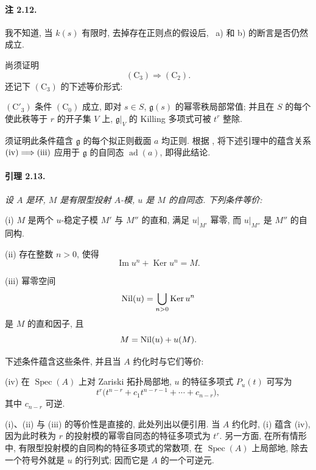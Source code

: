 \paragraph{\textbf{注 2.12.}}
我不知道, 当 \(k(s)\) 有限时, 去掉存在正则点的假设后, ~a) 和 b) 的断言是否仍然成立.

尚须证明
\[
  (\mathrm C_3)\Longrightarrow(\mathrm C_2).
\]
还记下 \((\mathrm C_3)\) 的下述等价形式:

\smallskip
\noindent
\textup{\((\mathrm C'_3)\)}
条件 \((\mathrm C_0)\) 成立, 即对 \(s\in S\), \(\mathfrak g(s)\) 的幂零秩局部常值; 并且在 \(S\) 的每个使此秩等于 \(r\) 的开子集 \(V\) 上, \(\mathfrak g|_V\) 的 Killing 多项式可被 \(t^r\) 整除.

\smallskip
须证明此条件蕴含 \(\mathfrak g\) 的每个拟正则截面 \(a\) 均正则. 根据 , 将下述引理中的蕴含关系 \(\textup{(iv)}\Longrightarrow\textup{(iii)}\) 应用于 \(\mathfrak g\) 的自同态 \(\operatorname{ad}(a)\), 即得此结论.

\paragraph{\textbf{引理 2.13.}}
{\itshape 设 \(A\) 是环, \(M\) 是有限型投射 \(A\)-模, \(u\) 是 \(M\) 的自同态. 下列条件等价:

\smallskip
\noindent
\textup{(i)}
\(M\) 是两个 \(u\)-稳定子模 \(M'\) 与 \(M''\) 的直和, 满足 \(u|_{M'}\) 幂零, 而 \(u|_{M''}\) 是 \(M''\) 的自同构.

\smallskip
\noindent
\textup{(ii)}
存在整数 \(n>0\), 使得
\[
  \operatorname{Im}u^n+\operatorname{Ker}u^n=M.
\]

\smallskip
\noindent
\textup{(iii)}
幂零空间
\[
  \operatorname{Nil}(u)=\bigcup_{n>0}\operatorname{Ker}u^n
\]
是 \(M\) 的直和因子, 且
\[
  M=\operatorname{Nil}(u)+u(M).
\]

\smallskip
下述条件蕴含这些条件, 并且当 \(A\) 约化时与它们等价:

\smallskip
\noindent
\textup{(iv)}
在 \(\operatorname{Spec}(A)\) 上对 Zariski 拓扑局部地, \(u\) 的特征多项式 \(P_u(t)\) 可写为
\[
  t^r\bigl(t^{n-r}+c_1t^{n-r-1}+\cdots+c_{n-r}\bigr),
\]
其中 \(c_{n-r}\) 可逆.}

\textup{(i)}、\textup{(ii)} 与 \textup{(iii)} 的等价性是直接的, 此处列出以便引用. 当 \(A\) 约化时, \textup{(i)} 蕴含 \textup{(iv)}, 因为此时秩为 \(r\) 的投射模的幂零自同态的特征多项式为 \(t^r\). 另一方面, 在所有情形中, 有限型投射模的自同构的特征多项式的常数项, 在 \(\operatorname{Spec}(A)\) 上局部地, 除去一个符号外就是 \(u\) 的行列式; 因而它是 \(A\) 的一个可逆元.


